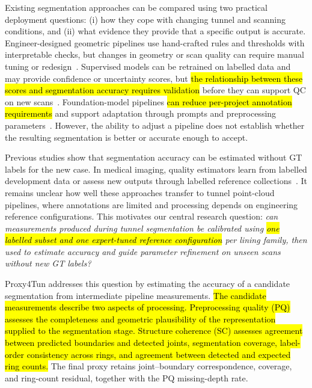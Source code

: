 \documentclass[a4paper,fleqn]{cas-dc}
\begin{document}
Existing segmentation approaches can be compared using two practical deployment questions: (i) how they cope with changing tunnel and scanning conditions, and (ii) what evidence they provide that a specific output is accurate. Engineer-designed geometric pipelines use hand-crafted rules and thresholds with interpretable checks, but changes in geometry or scan quality can require manual tuning or redesign~\cite{huang2021bim,weidner2024generalized,wang2025automated}. Supervised models can be retrained on labelled data and may provide confidence or uncertainty scores, but \hl{the relationship between these scores and segmentation accuracy requires validation} before they can support QC on new scans~\cite{su2024review,cha2024deep}. Foundation-model pipelines \hl{can reduce per-project annotation requirements} and support adaptation through prompts and preprocessing parameters~\cite{bommasani2021foundation,kirillov2023sam,ye2024sam}. However, the ability to adjust a pipeline does not establish whether the resulting segmentation is better or accurate enough to accept.

Previous studies show that segmentation accuracy can be estimated without GT labels for the new case. In medical imaging, quality estimators learn from labelled development data or assess new outputs through labelled reference collections~\cite{valindria2017rca,robinson2018segmentationQuality,fournel2021segmentationQC}. It remains unclear how well these approaches transfer to tunnel point-cloud pipelines, where annotations are limited and processing depends on engineering reference configurations. This motivates our central research question: \emph{can measurements produced during tunnel segmentation be calibrated using \hl{one labelled subset and one expert-tuned reference configuration} per lining family, then used to estimate accuracy and guide parameter refinement on unseen scans without new GT labels?}

Proxy4Tun addresses this question by estimating the accuracy of a candidate segmentation from intermediate pipeline measurements. \hl{The candidate measurements describe two aspects of processing. Preprocessing quality (PQ) assesses the completeness and geometric plausibility of the representation supplied to the segmentation stage. Structure coherence (SC) assesses agreement between predicted boundaries and detected joints, segmentation coverage, label-order consistency across rings, and agreement between detected and expected ring counts.} The final proxy retains joint--boundary correspondence, coverage, and ring-count residual, together with the PQ missing-depth rate.
\end{document}
